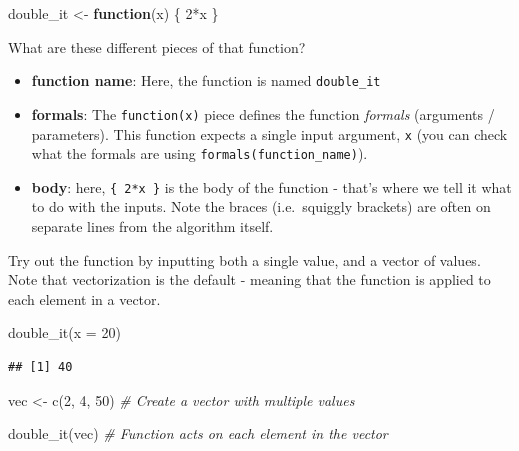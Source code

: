 \documentclass[
]{book}
\newenvironment{Shaded}{\begin{snugshade}}{\end{snugshade}}
\newcommand{\AttributeTok}[1]{\textcolor[rgb]{0.77,0.63,0.00}{#1}}
\newcommand{\CommentTok}[1]{\textcolor[rgb]{0.56,0.35,0.01}{\textit{#1}}}
\newcommand{\ControlFlowTok}[1]{\textcolor[rgb]{0.13,0.29,0.53}{\textbf{#1}}}
\newcommand{\DecValTok}[1]{\textcolor[rgb]{0.00,0.00,0.81}{#1}}
\newcommand{\FunctionTok}[1]{\textcolor[rgb]{0.00,0.00,0.00}{#1}}
\newcommand{\NormalTok}[1]{#1}
\newcommand{\OtherTok}[1]{\textcolor[rgb]{0.56,0.35,0.01}{#1}}
\newcommand{\SpecialCharTok}[1]{\textcolor[rgb]{0.00,0.00,0.00}{#1}}
\providecommand{\tightlist}{%
  \setlength{\itemsep}{0pt}\setlength{\parskip}{0pt}}
\begin{document}
\begin{Shaded}
\begin{Highlighting}[]
\NormalTok{double\_it }\OtherTok{\textless{}{-}} \ControlFlowTok{function}\NormalTok{(x) \{}
  \DecValTok{2}\SpecialCharTok{*}\NormalTok{x}
\NormalTok{\}}
\end{Highlighting}
\end{Shaded}

What are these different pieces of that function?

\begin{itemize}
\tightlist
\item
  \textbf{function name}: Here, the function is named \texttt{double\_it}
\item
  \textbf{formals}: The \texttt{function(x)} piece defines the function \emph{formals} (arguments / parameters). This function expects a single input argument, \texttt{x} (you can check what the formals are using \texttt{formals(function\_name)}).
\item
  \textbf{body}: here, \texttt{\{\ 2*x\ \}} is the body of the function - that's where we tell it what to do with the inputs. Note the braces (i.e.~squiggly brackets) are often on separate lines from the algorithm itself.
\end{itemize}

Try out the function by inputting both a single value, and a vector of values. Note that vectorization is the default - meaning that the function is applied to each element in a vector.

\begin{Shaded}
\begin{Highlighting}[]
\FunctionTok{double\_it}\NormalTok{(}\AttributeTok{x =} \DecValTok{20}\NormalTok{)}
\end{Highlighting}
\end{Shaded}

\begin{verbatim}
## [1] 40
\end{verbatim}

\begin{Shaded}
\begin{Highlighting}[]
\NormalTok{vec }\OtherTok{\textless{}{-}} \FunctionTok{c}\NormalTok{(}\DecValTok{2}\NormalTok{, }\DecValTok{4}\NormalTok{, }\DecValTok{50}\NormalTok{) }\CommentTok{\# Create a vector with multiple values}

\FunctionTok{double\_it}\NormalTok{(vec) }\CommentTok{\# Function acts on each element in the vector}
\end{Highlighting}
\end{Shaded}
\end{document}
